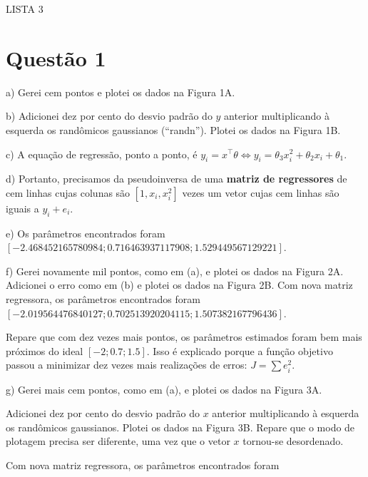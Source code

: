 \documentclass{rbfin}
\begin{document}
\rbfe{}


\large

\begin{center}
LISTA 3
\end{center}

\normalsize

\doublespacing

\section*{Questão 1}

a) Gerei cem pontos e plotei os dados na Figura 1A.

b) Adicionei dez por cento do desvio padrão do $y$ anterior multiplicando à esquerda os randômicos gaussianos (``randn''). Plotei os dados na Figura 1B.

c) A equação de regressão, ponto a ponto, é $y_i = x^\top \theta \Leftrightarrow y_i = \theta_3 x_i^2 + \theta_2 x_i + \theta_1$.

d) Portanto, precisamos da pseudoinversa de uma \textbf{matriz de regressores} de cem linhas cujas colunas são $[1, x_i, x_i^2]$ vezes um vetor cujas cem linhas são iguais a $y_i + e_i$.

e) Os parâmetros encontrados foram $[-2.468452165780984; 0.716463937117908; 1.529449567129221]$.

f) Gerei novamente mil pontos, como em (a), e plotei os dados na Figura 2A. Adicionei o erro como em (b) e plotei os dados na Figura 2B. Com nova matriz regressora, os parâmetros encontrados foram $[-2.019564476840127;0.702513920204115;1.507382167796436]$.

Repare que com dez vezes mais pontos, os parâmetros estimados foram bem mais próximos do ideal $[-2; 0.7; 1.5]$. Isso é explicado porque a função objetivo passou a minimizar dez vezes mais realizações de erros: $J = \sum e_i^2$.

g) Gerei mais cem pontos, como em (a), e plotei os dados na Figura 3A. 

Adicionei dez por cento do desvio padrão do $x$ anterior multiplicando à esquerda os randômicos gaussianos. Plotei os dados na Figura 3B. Repare que o modo de plotagem precisa ser diferente, uma vez que o vetor $x$ tornou-se desordenado.

Com nova matriz regressora, os parâmetros encontrados foram 
\end{document}
